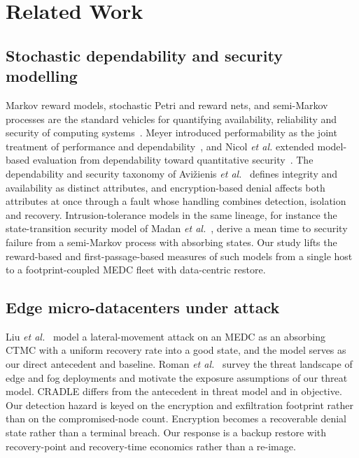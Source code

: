 \documentclass[journal]{IEEEtran}
\begin{document}
\section{Related Work}\label{sec:related}
\subsection{Stochastic dependability and security modelling}
Markov reward models, stochastic Petri and reward nets, and semi-Markov
processes are the standard vehicles for quantifying availability, reliability
and security of computing systems~\cite{trivedi2016probability,
trivedi2017reliability,nicol2004modelbased,ciardo1992srn}. Meyer introduced
performability as the joint treatment of performance and
dependability~\cite{meyer1980performability}, and Nicol \emph{et al.} extended
model-based evaluation from dependability toward quantitative
security~\cite{nicol2004modelbased}. The dependability and security taxonomy of
Avi\v{z}ienis \emph{et al.}~\cite{avizienis2004basic} defines integrity and
availability as distinct attributes, and encryption-based denial affects both
attributes at once through a fault whose handling combines detection, isolation
and recovery. Intrusion-tolerance models in the same lineage, for instance the
state-transition security model of Madan \emph{et al.}~\cite{madan2004method},
derive a mean time to security failure from a semi-Markov process with
absorbing states. Our study lifts the reward-based and first-passage-based
measures of such models from a single host to a footprint-coupled MEDC fleet
with data-centric restore.

\subsection{Edge micro-datacenters under attack}
Liu \emph{et al.}~\cite{liu2021transient} model a lateral-movement attack on an
MEDC as an absorbing CTMC with a uniform recovery rate into a good state, and
the model serves as our direct antecedent and baseline. Roman \emph{et
al.}~\cite{roman2018survey} survey the threat landscape of edge and fog
deployments and motivate the exposure assumptions of our threat model. CRADLE
differs from the antecedent in threat model and in objective. Our detection
hazard is keyed on the encryption and exfiltration footprint rather than on the
compromised-node count. Encryption becomes a recoverable denial state rather
than a terminal breach. Our response is a backup restore with recovery-point
and recovery-time economics rather than a re-image.
\end{document}
